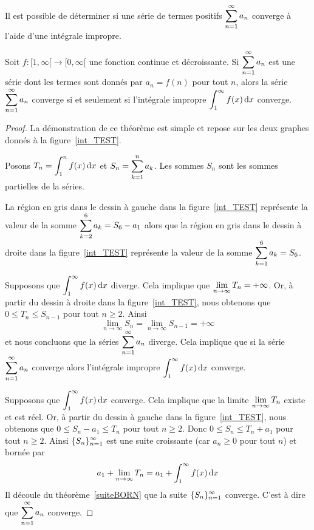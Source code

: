 {Il est possible de déterminer si une série de termes positifs
$\displaystyle \sum_{n=1}^\infty a_n$ converge à l'aide d'une intégrale 
impropre.

\begin{theorem} 
Soit $f:[1,\infty[\rightarrow [0,\infty[$ une fonction continue et
décroissante.  Si $\displaystyle \sum_{n=1}^\infty a_n$ est une série dont
les termes sont donnés par $a_n = f(n)$ pour tout $n$, alors la série
$\displaystyle \sum_{n=1}^\infty a_n$ converge si et seulement si l'intégrale
impropre $\displaystyle \int_1^\infty f(x)\,\mathrm{d}x$ converge.
\end{theorem}

\begin{proof}
La démonstration de ce théorème est simple et repose sur les deux
graphes donnés à la figure~\ref{int_TEST}.


Posons $\displaystyle T_n = \int_1^n f(x)\,\mathrm{d}x$ et
$\displaystyle S_n = \sum_{k=1}^n a_k$.  Les sommes $S_n$ sont les
sommes partielles de la séries.

La région en gris dans le dessin à gauche dans la
figure~\ref{int_TEST} représente la valeur de la somme
$\displaystyle \sum_{k=2}^6 a_k = S_6 - a_1$ alors que la région en gris
dans le dessin à droite dans la figure~\ref{int_TEST} représente la
valeur de la somme $\displaystyle \sum_{k=1}^6 a_k = S_6$.

 Supposons que $\displaystyle \int_1^\infty f(x)\,\mathrm{d}x$ diverge. Cela
implique que $\displaystyle \lim_{n\rightarrow \infty} T_n = +\infty$.
Or, à partir du dessin à droite dans la figure~\ref{int_TEST}, nous
obtenons que $0 \leq T_n \leq S_{n-1}$ pour tout $n\geq 2$.  Ainsi
\[
\lim_{n\rightarrow \infty} S_n =
\lim_{n\rightarrow \infty} S_{n-1} = +\infty
\]
et nous concluons que la séries $\displaystyle \sum_{n=1}^\infty a_n$ diverge.
Cela implique que si la série $\displaystyle \sum_{n=1}^\infty a_n$
converge alors l'intégrale impropre
$\displaystyle \int_1^\infty f(x)\,\mathrm{d}x$ converge.

 Supposons que $\displaystyle \int_1^\infty f(x)\,\mathrm{d}x$ converge.
Cela implique que la limite $\displaystyle \lim_{n\rightarrow \infty} T_n$
existe et est réel.  Or, à partir du dessin à gauche dans la
figure~\ref{int_TEST}, nous obtenons que
$0 \leq S_n - a_1 \leq T_n$ pour tout $n\geq 2$.  Donc
$0 \leq S_n \leq T_n + a_1$ pour tout $n\geq 2$.  Ainsi
$\displaystyle \{S_n\}_{n=1}^\infty$ est une suite croissante (car
$a_n \geq 0$ pour tout $n$) et bornée par
\[
a_1 + \lim_{n\rightarrow \infty} T_n = a_1 + \int_1^\infty f(x)\,\mathrm{d}x
\]
Il découle du théorème~\ref{suiteBORN} que la suite
$\displaystyle \{S_n\}_{n=1}^\infty$ converge.  C'est à dire que
$\displaystyle \sum_{n=1}^\infty a_n$ converge.
\end{proof}

}
